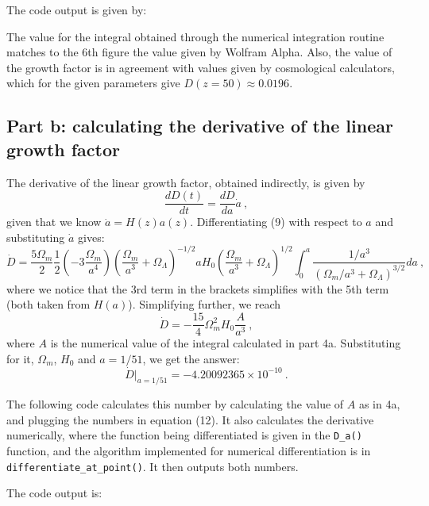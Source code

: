 \documentclass{article}
\begin{document}
The code output is given by:


The value for the integral obtained through the numerical integration routine matches to the 6th figure the value given by Wolfram Alpha. Also, the value of the growth factor is in agreement with values given by cosmological calculators, which for the given parameters give $D(z=50) \approx 0.0196$.

\subsection{Part b: calculating the derivative of the linear growth factor}
The derivative of the linear growth factor, obtained indirectly, is given by
\begin{equation}
    \dfrac{dD(t)}{dt} = \frac{dD}{da}\dot{a}\ , 
\end{equation}
given that we know $\dot{a} = H(z)a(z)$. Differentiating (9) with respect to $a$ and substituting $\dot{a}$ gives:
\begin{equation}
    \dot{D} = \frac{5\Omega_m}{2}\frac{1}{2}\left(-3\frac{\Omega_m}{a^4} \right)\left(\frac{\Omega_m}{a^3}+\Omega_{\Lambda}\right)^{-1/2} a H_0 \left(\frac{\Omega_m}{a^3} + \Omega_{\Lambda}\right)^{1/2} \int_0^{a} \frac{1/a^3}{(\Omega_m/a^3 + \Omega_{\Lambda})^{3/2}}da \ ,
\end{equation}
where we notice that the 3rd term in the brackets simplifies with the 5th term (both taken from $H(a)$). Simplifying further, we reach
\begin{equation}
    \dot{D} = -\frac{15}{4}\Omega_m^2 H_0 \frac{A}{a^3} \ , 
\end{equation}
where $A$ is the numerical value of the integral calculated in part 4a. Substituting for it, $\Omega_m$, $H_0$ and $a = 1/51$, we get the answer:
\begin{equation}
    \boxed{\dot{D}|_{a = 1/51} = -4.20092365\times10^{-10}} \ .
\end{equation}

The following code calculates this number by calculating the value of $A$ as in 4a, and plugging the numbers in equation (12). It also calculates the derivative numerically, where the function being differentiated is given in the \verb+D_a()+ function, and the algorithm implemented for numerical differentiation is in \verb+differentiate_at_point()+. It then outputs both numbers.


The code output is:

\end{document}
